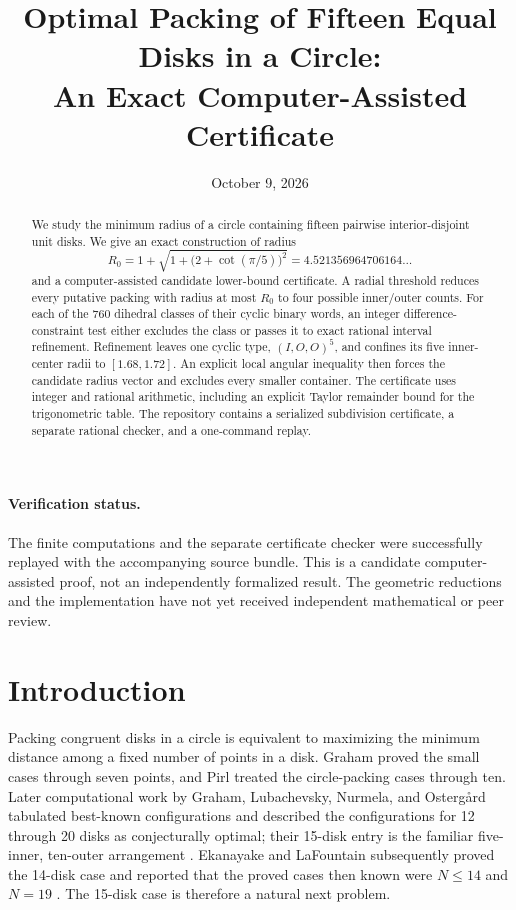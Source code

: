 \documentclass[11pt]{article}
\title{Optimal Packing of Fifteen Equal Disks in a Circle:\\An Exact Computer-Assisted Certificate}
\author{}
\date{October 9, 2026}
\theoremstyle{definition}
\begin{document}
\maketitle

\begin{abstract}
We study the minimum radius of a circle containing fifteen pairwise interior-disjoint unit disks. We give an exact construction of radius
\[
  R_0=1+\sqrt{1+\bigl(2+\cot(\pi/5)\bigr)^2}
     =4.521356964706164\ldots
\]
and a computer-assisted candidate lower-bound certificate. A radial threshold reduces every putative packing with radius at most $R_0$ to four possible inner/outer counts. For each of the 760 dihedral classes of their cyclic binary words, an integer difference-constraint test either excludes the class or passes it to exact rational interval refinement. Refinement leaves one cyclic type, $(I,O,O)^5$, and confines its five inner-center radii to $[1.68,1.72]$. An explicit local angular inequality then forces the candidate radius vector and excludes every smaller container. The certificate uses integer and rational arithmetic, including an explicit Taylor remainder bound for the trigonometric table. The repository contains a serialized subdivision certificate, a separate rational checker, and a one-command replay.
\end{abstract}

\paragraph{Verification status.}
The finite computations and the separate certificate checker were successfully replayed with the accompanying source bundle. This is a candidate computer-assisted proof, not an independently formalized result. The geometric reductions and the implementation have not yet received independent mathematical or peer review.

\section{Introduction}\label{sec:intro}

Packing congruent disks in a circle is equivalent to maximizing the minimum distance among a fixed number of points in a disk. Graham proved the small cases through seven points, and Pirl treated the circle-packing cases through ten. Later computational work by Graham, Lubachevsky, Nurmela, and Ostergård tabulated best-known configurations and described the configurations for 12 through 20 disks as conjecturally optimal; their 15-disk entry is the familiar five-inner, ten-outer arrangement \cite{Graham1968,Pirl1969,GrahamEtAl1998}. Ekanayake and LaFountain subsequently proved the 14-disk case and reported that the proved cases then known were $N\le14$ and $N=19$ \cite{EF2024}. The 15-disk case is therefore a natural next problem.
\end{document}
